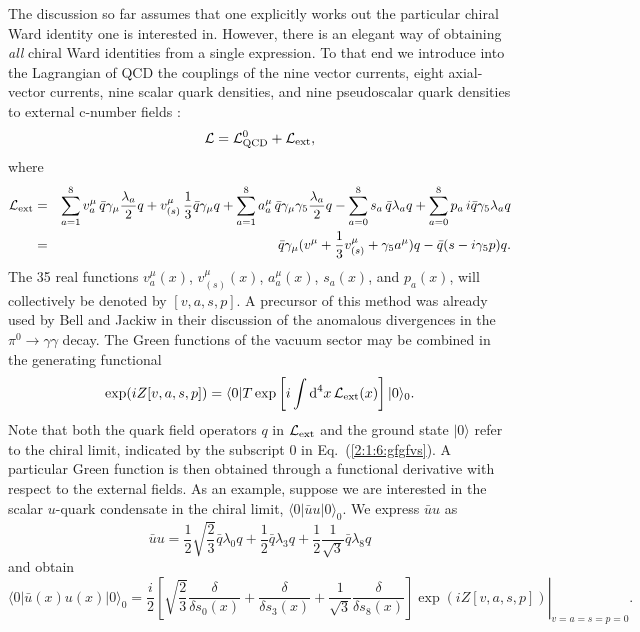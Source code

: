 \documentclass[twoside,12pt]{article}
\begin{document}
  The discussion so far assumes that one explicitly works out the
particular chiral Ward identity one is interested in.
   However, there is an elegant way of obtaining {\em all} chiral Ward
identities from a single expression.
   To that end we introduce into the Lagrangian of QCD the couplings of the
nine vector currents, eight axial-vector currents, nine scalar quark densities,
and nine pseudoscalar quark densities
to external c-number fields \cite{Gasser:1984gg}:
\begin{equation}
\label{2:1:6:lQCD+ext}
{\cal L}={\cal L}^0_{\rm QCD}+{\cal L}_{\rm ext},
\end{equation}
where
\begin{eqnarray}
\label{2:1:6:lqcds}
{\cal L}_{\rm ext}&=&
\sum_{a=1}^8v^\mu_a\, \bar q\gamma_\mu\frac{\lambda_a}{2} q
+v^\mu_{(s)}\, \frac{1}{3}\bar q\gamma_\mu q
+ \sum_{a=1}^8a^\mu_a\,\bar q\gamma_\mu\gamma_5\frac{\lambda_a}{2} q
-\sum_{a=0}^8 s_a\, \bar q\lambda_a q
+\sum_{a=0}^8 p_a\, i\bar q\gamma_5\lambda_a q
\nonumber\\
&=&\bar{q}\gamma_\mu (v^\mu
+\frac{1}{3}v^\mu_{(s)} +\gamma_5 a^\mu )q -\bar{q}(s-i\gamma_5 p)q.
\end{eqnarray}
   The 35 real functions $v^\mu_a(x)$, $v^\mu_{(s)}(x)$, $a^\mu_a(x)$,
$s_a(x)$, and $p_a(x)$, will collectively be denoted by $[v,a,s,p]$.
   A precursor of this method was already used by Bell and Jackiw \cite{Bell:1969ts}
in their discussion of the anomalous divergences in the $\pi^0\to\gamma\gamma$ decay.
   The Green functions of the vacuum sector may be combined in the generating functional
\begin{equation}
\label{2:1:6:gfgfvs}
\exp(i Z[v,a,s,p]) =\langle 0|T\exp\left[i\int \mbox{d}^4 x\, {\cal
L}_{\rm ext}(x) \right]|0\rangle_0.
\end{equation}
   Note that both the quark field operators $q$ in ${\cal L}_{\rm ext}$ and the ground
state $|0\rangle$ refer to the chiral limit, indicated by the subscript 0 in Eq.~(\ref{2:1:6:gfgfvs}).
   A particular Green function is then obtained through a functional derivative with
respect to the external fields.
   As an example, suppose we are interested in the scalar $u$-quark condensate in the chiral
limit, $\langle 0| \bar{u}u|0\rangle_0$.
   We express $\bar u u$ as
\begin{displaymath}
\bar u u=\frac{1}{2}\sqrt{\frac{2}{3}}\bar q\lambda_0 q
+\frac{1}{2}\bar q\lambda_3 q +\frac{1}{2}\frac{1}{\sqrt{3}} \bar
q\lambda_8 q
\end{displaymath}
and obtain
\begin{displaymath}
\langle 0|\bar{u}(x) u(x)|0\rangle_0 = \left.\frac{i}{2}\left[\sqrt{\frac{2}{3}}\frac{\delta}{\delta
s_0(x)} +\frac{\delta}{\delta s_3(x)} +\frac{1}{\sqrt{3}}
\frac{\delta}{\delta s_8(x)}\right]
\exp(iZ[v,a,s,p])\right|_{v=a=s=p=0}.
\end{displaymath}
\end{document}
